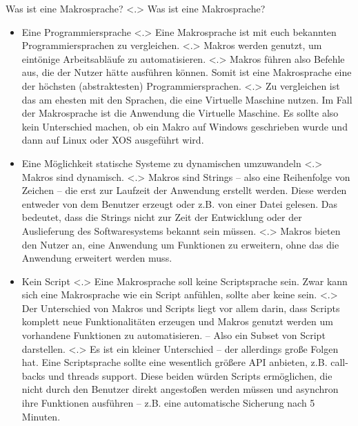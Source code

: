   \begin{frame}{Was ist eine Makrosprache?}
    \vspace*{1em}%
    \pause
        \note[item]<.>{
          Was ist eine Makrosprache?
        }
    \begin{itemize}[<+- | alert@+>]
      \item
        Eine Programmiersprache
            \note[item]<.>{
              Eine Makrosprache ist mit euch bekannten Programmiersprachen zu vergleichen.
            }
            \note[item]<.>{
              Makros werden genutzt, um eintönige Arbeitsabläufe zu automatisieren.
            }
            \note[item]<.>{
              Makros führen also Befehle aus, die der Nutzer hätte ausführen können. Somit ist eine Makrosprache eine der höchsten (abstraktesten) Programmiersprachen.
            }
            \note[item]<.>{
              Zu vergleichen ist das am ehesten mit den Sprachen, die eine Virtuelle Maschine nutzen. Im Fall der Makrosprache ist die Anwendung die Virtuelle Maschine. Es sollte also kein Unterschied machen, ob ein Makro auf Windows geschrieben wurde und dann auf Linux oder XOS ausgeführt wird.
            }
      \item
        Eine Möglichkeit statische Systeme zu dynamischen umzuwandeln
            \note[item]<.>{
              Makros sind dynamisch.
            }
            \note[item]<.>{
              Makros sind Strings -- also eine Reihenfolge von Zeichen -- die erst zur Laufzeit der Anwendung erstellt werden. Diese werden entweder von dem Benutzer erzeugt oder z.B. von einer Datei gelesen. Das bedeutet, dass die Strings nicht zur Zeit der Entwicklung oder der Auslieferung des Softwaresystems bekannt sein müssen.
            }
            \note[item]<.>{
              Makros bieten den Nutzer an, eine Anwendung um Funktionen zu erweitern, ohne das die Anwendung erweitert werden muss.
            }
      \item
        Kein Script
            \note[item]<.>{
              Eine Makrosprache soll keine Scriptsprache sein. Zwar kann sich eine Makrosprache wie ein Script anfühlen, sollte aber keine sein.
            }
            \note[item]<.>{
              Der Unterschied von Makros und Scripts liegt vor allem darin, dass Scripts komplett neue Funktionalitäten erzeugen und Makros genutzt werden um vorhandene Funktionen zu automatisieren. -- Also ein Subset von Script darstellen.
            }
            \note[item]<.>{
              Es ist ein kleiner Unterschied -- der allerdings große Folgen hat. Eine Scriptsprache sollte eine wesentlich größere API anbieten, z.B. call-backs und threads support. Diese beiden würden Scripts ermöglichen, die nicht durch den Benutzer direkt angestoßen werden müssen und asynchron ihre Funktionen ausführen -- z.B. eine automatische Sicherung nach 5 Minuten.
            }
    \end{itemize}
  \end{frame}

